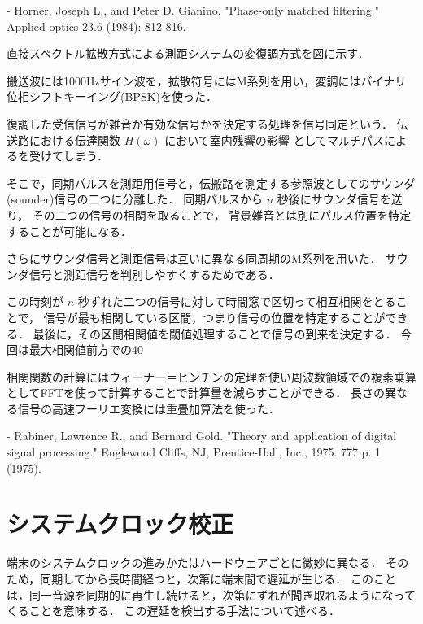 - Horner, Joseph L., and Peter D. Gianino. "Phase-only matched filtering." Applied optics 23.6 (1984): 812-816.

直接スペクトル拡散方式による測距システムの変復調方式を図に示す．




搬送波には1000Hzサイン波を，拡散符号にはM系列を用い，変調にはバイナリ位相シフトキーイング(BPSK)を使った．

復調した受信信号が雑音か有効な信号かを決定する処理を信号同定という．
伝送路における伝達関数 $H(\omega)$ において室内残響の影響
としてマルチパスによるを受けてしまう．


そこで，同期パルスを測距用信号と，伝搬路を測定する参照波としてのサウンダ(sounder)信号の二つに分離した．
同期パルスから $n$ 秒後にサウンダ信号を送り，
その二つの信号の相関を取ることで，
背景雑音とは別にパルス位置を特定することが可能になる．


さらにサウンダ信号と測距信号は互いに異なる同周期のM系列を用いた．
サウンダ信号と測距信号を判別しやすくするためである．

この時刻が $n$ 秒ずれた二つの信号に対して時間窓で区切って相互相関をとることで，
信号が最も相関している区間，つまり信号の位置を特定することができる．
最後に，その区間相関値を閾値処理することで信号の到来を決定する．
今回は最大相関値前方での40%

相関関数の計算にはウィーナー＝ヒンチンの定理を使い周波数領域での複素乗算としてFFTを使って計算することで計算量を減らすことができる．
長さの異なる信号の高速フーリエ変換には重畳加算法を使った．

- Rabiner, Lawrence R., and Bernard Gold. "Theory and application of digital signal processing." Englewood Cliffs, NJ, Prentice-Hall, Inc., 1975. 777 p. 1 (1975).


\section{システムクロック校正}

端末のシステムクロックの進みかたはハードウェアごとに微妙に異なる．
そのため，同期してから長時間経つと，次第に端末間で遅延が生じる．
このことは，同一音源を同期的に再生し続けると，次第にずれが聞き取れるようになってくることを意味する．
この遅延を検出する手法について述べる．

